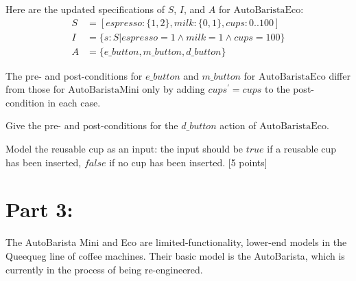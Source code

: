 \documentclass[12pt,fleqn]{article}
\begin{document}
\begin{enumerate}
Here are the updated specifications of $S$, $I$, and $A$ for $\mathrm{AutoBaristaEco}$:
\begin{equation*}\begin{split}
S &= [ espresso :\{ 1, 2 \}, milk : \{ 0, 1 \}, cups : 0..100 ]\\
I &= \{ s: S | espresso = 1 \land milk = 1 \land cups = 100 \}\\
A &= \{ e\_button, m\_button, d\_button\}
\end{split}\end{equation*}

The pre- and post-conditions for $e\_button$ and $m\_button$ for $\mathrm{AutoBaristaEco}$ differ from those for $\mathrm{AutoBaristaMini}$ only by adding $cups^\prime = cups$ to the post-condition in each case.

Give the pre- and post-conditions for the $d\_button$ action of $\mathrm{AutoBaristaEco}$.

Model the reusable cup as an input: the input should be $true$ if a reusable cup has been inserted, $false$ if no cup has been inserted. [5 points]




\clearpage

\section*{\sc Part 3:}

The AutoBarista Mini and Eco are limited-functionality, lower-end models in the Queequeg line of coffee machines. Their basic model is the AutoBarista, which is currently in the process of being re-engineered.


\end{enumerate}
\end{document}
